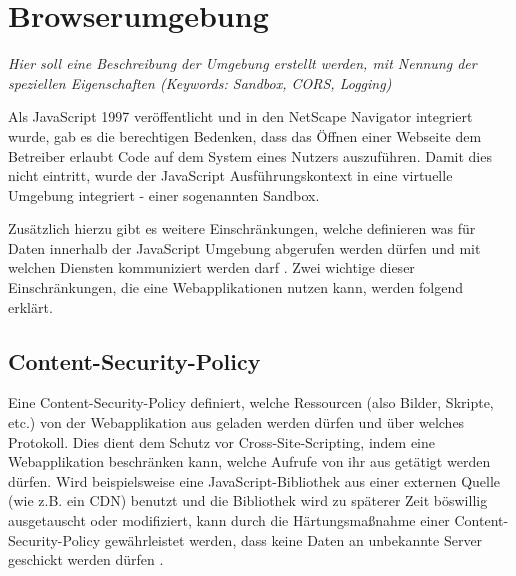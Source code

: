 \section{Browserumgebung}

\textit{Hier soll eine Beschreibung der Umgebung erstellt werden, mit Nennung der speziellen Eigenschaften (Keywords: Sandbox, CORS, Logging)}

Als JavaScript 1997 veröffentlicht und in den NetScape Navigator integriert wurde, gab es die berechtigen Bedenken, dass das Öffnen einer Webseite dem Betreiber erlaubt Code auf dem System eines Nutzers auszuführen. Damit dies nicht eintritt, wurde der JavaScript Ausführungskontext in eine virtuelle Umgebung  integriert - einer sogenannten Sandbox. \cite{LearningJavaScript}

Zusätzlich hierzu gibt es weitere Einschränkungen, welche definieren was für Daten innerhalb der JavaScript Umgebung abgerufen werden dürfen und mit welchen Diensten kommuniziert werden darf \cite{LearningJavaScript}. Zwei wichtige dieser Einschränkungen, die eine Webapplikationen nutzen kann, werden folgend erklärt.


\subsection{Content-Security-Policy}


Eine Content-Security-Policy definiert, welche Ressourcen (also Bilder, Skripte, etc.) von der Webapplikation aus geladen werden dürfen und über welches Protokoll. Dies dient dem Schutz vor Cross-Site-Scripting, indem eine Webapplikation beschränken kann, welche Aufrufe von ihr aus getätigt werden dürfen. Wird beispielsweise eine JavaScript-Bibliothek aus einer externen Quelle (wie z.B. ein CDN) benutzt und die Bibliothek wird zu späterer Zeit böswillig ausgetauscht oder modifiziert, kann durch die Härtungsmaßnahme einer Content-Security-Policy gewährleistet werden, dass keine Daten an unbekannte Server geschickt werden dürfen \cite{MDNContentSecurityPolicy}.


